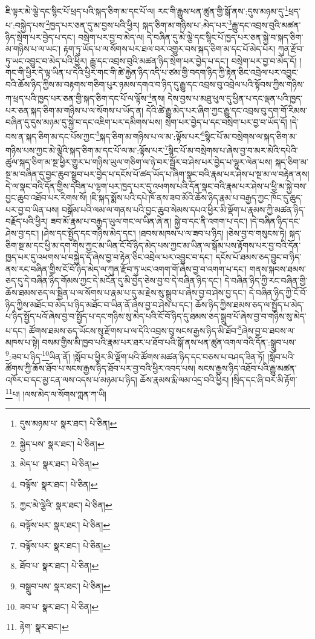 ཇི་ལྟར་མེ་ལྕེ་དང་སྙིང་པོ་ཕྲད་པའི་སྐད་ཅིག་མ་དང་པོ་ལ། རང་གི་རྒྱུས་ཕན་ཚུན་གྱི་སྒོ་ནས་:དུས་མཉམ་དུ་\footnote{དུས་མཉམ་པ་  སྣར་ཐང་།  པེ་ཅིན། }ཕྲད་པ་:བསྐྱེད་པས་\footnote{སྐྱེད་པས་  སྣར་ཐང་།  པེ་ཅིན། }ཁྱད་པར་ཅན་དུ་མ་བྱས་པའི་ཕྱིར། སྐད་ཅིག་མ་གཉིས་པ་:མེད་པར་\footnote{མེད་པ་  སྣར་ཐང་།  པེ་ཅིན། }རྒྱུ་དང་འབྲས་བུའི་མཚན་ཉིད་སྲེག་པར་བྱེད་པ་དང་། བསྲེག་པར་བྱ་བ་མེད་ལ། དེ་བཞིན་དུ་མེ་ལྕེ་དང་སྙིང་པོ་ཁྱད་པར་ཅན་སྐྱེ་བ་སྐད་ཅིག་མ་གཉིས་པ་ལ་ཡང་། རྟག་ཏུ་ཡོད་པ་ལ་སོགས་པར་ཐལ་བར་འགྱུར་བས་སྐད་ཅིག་མ་དང་པོ་མེད་པར། ཀུན་རྫོབ་ཏུ་ཡང་འབྱུང་བ་མེད་པའི་ཕྱིར། རྒྱུ་དང་འབྲས་བུའི་མཚན་ཉིད་སྲེག་པར་བྱེད་པ་དང་། བསྲེག་པར་བྱ་བ་མེད་དོ། །གང་གི་ཕྱིར་དེ་ལྟ་ཡིན་པ་དེའི་ཕྱིར་གང་གི་ཚེ་རྐྱེན་ཉིད་འདི་པ་ཙམ་གྱི་བདག་ཉིད་ཀྱི་རྟེན་ཅིང་འབྲེལ་པར་འབྱུང་བའི་ཆོས་ཉིད་ཀྱིས་མ་བརྟགས་གཅིག་པུར་ཉམས་དགའ་བ་ཉིད་དུ་རྒྱུ་དང་འབྲས་བུ་འབྲེལ་པའི་སྟོབས་ཀྱིས་གཉིས་ཀ་ཕྲད་པའི་ཁྱད་པར་ཅན་གྱི་སྐད་ཅིག་དང་པོ་ལ་ལྟོས་\footnote{བལྟོས་  སྣར་ཐང་།  པེ་ཅིན། }ནས། དེས་བྱས་པ་མཐུ་ཕུལ་དུ་ཕྱིན་པ་དང་ལྡན་པའི་ཁྱད་པར་ཅན་སྐད་ཅིག་མ་གཉིས་པ་ལ་སོགས་པ་ཡོད་ན། དེའི་ཚེ་རྒྱུ་མེད་པར་ཞིག་ཀྱང་རྒྱུ་དང་འབྲས་བུ་དག་གོ་རིམས་བཞིན་དུ་དུས་མཉམ་དུ་སྐྱེ་བ་དང་འཇིག་པར་དམིགས་པས། སྲེག་པར་བྱེད་པ་དང་བསྲེག་པར་བྱ་བ་ཡོད་དོ། །དེ་བས་ན་སྐད་ཅིག་མ་དང་པོས་ཀྱང་\footnote{ཀྱང་མེ་ལྕེའི་  སྣར་ཐང་།  པེ་ཅིན། }སྐད་ཅིག་མ་གཉིས་པ་ལ་མ་:ལྟོས་པར་\footnote{བལྟོས་པར་  སྣར་ཐང་།  པེ་ཅིན། }སྙིང་པོ་མ་བསྲེགས་ལ་སྐད་ཅིག་མ་གཉིས་པས་ཀྱང་མེ་ལྕེའི་སྐད་ཅིག་མ་དང་པོ་ལ་མ་:ལྟོས་པར་\footnote{བལྟོས་པར་  སྣར་ཐང་།  པེ་ཅིན། }སྙིང་པོ་མ་བསྲེགས་པ་ཞེས་བྱ་བ་མར་མེའི་དཔེའི་ཚུལ་སྐད་ཅིག་མ་སྔ་ཕྱིར་གྱུར་པ་གཉིས་ཡུལ་གཅིག་ལ་ཉེ་བར་སྦྱོར་བ་ཤེས་པར་བྱེད་པ་ལྷུར་ལེན་པས། སྐད་ཅིག་མ་སྔ་མ་བཞིན་དུ་བྱང་ཆུབ་སྒྲུབ་པར་བྱེད་པ་དངོས་པོ་ཚད་ཡོད་པ་ཞིག་སྣང་བའི་རྣམ་པར་ཤེས་པ་སྔ་མ་ལ་བརྟེན་ནས། དེ་ལ་སྣང་བའི་དོན་གྱིས་དབེན་པ་ལྷག་པར་ཁྱད་པར་དུ་འཕགས་པའི་དོན་སྣང་བའི་རྣམ་པར་ཤེས་པ་ཕྱི་མ་སྐྱེ་བས་བྱང་ཆུབ་འཐོབ་པར་རིགས་སོ། །ཇི་སྐད་སྨོས་པའི་དཔེ་ཁོ་ནས་ཟབ་མོའི་ཆོས་ཉིད་རྣམ་པ་བརྒྱད་ཀྱང་ཁོང་དུ་ཆུད་པར་བྱ་བ་ཡིན་པས། བསྒོམ་པའི་ལམ་ལ་གནས་པའི་བྱང་ཆུབ་སེམས་དཔའ་ཕྱིར་མི་ལྡོག་པ་རྣམས་ཀྱི་མཚན་ཉིད་བརྗོད་པའི་ཕྱིར། ཟབ་མོ་རྣམ་པ་བརྒྱད་ཡུལ་གང་ལ་ཡིན་ཞེ་ན། སྐྱེ་བ་དང་ནི་འགག་པ་དང་། །དེ་བཞིན་ཉིད་དང་ཤེས་བྱ་དང་། །ཤེས་དང་སྤྱོད་དང་གཉིས་མེད་དང་། །ཐབས་མཁས་པ་ལ་ཟབ་པ་ཉིད། །ཅེས་བྱ་བ་གསུངས་ཏེ། སྐད་ཅིག་སྔ་མ་དང་ཕྱི་མ་དག་གིས་ཀྱང་མ་ཡིན་ངོ་བོ་ཉིད་མེད་པས་ཀྱང་མ་ཡིན་ལ་སྒོམ་པས་རྟོགས་པར་བྱ་བའི་དོན་ཁྱད་པར་དུ་འཕགས་པ་བསྐྱེད་དོ་ཞེས་བྱ་བ་རྟེན་ཅིང་འབྲེལ་པར་འབྱུང་བ་དང་། དངོས་པོ་ཐམས་ཅད་བྱུང་བ་ཉིད་ནས་རང་བཞིན་གྱིས་ངོ་བོ་ཉིད་མེད་ལ་ཀུན་རྫོབ་ཏུ་ཡང་འགག་གོ་ཞེས་བྱ་བ་འགག་པ་དང་། གནས་སྐབས་ཐམས་ཅད་དུ་དེ་བཞིན་ཉིད་གོམས་ཀྱང་དེ་མངོན་དུ་མི་བྱེད་ཅེས་བྱ་བ་དེ་བཞིན་ཉིད་དང་། དེ་བཞིན་ཉིད་ཀྱི་རང་བཞིན་གྱི་ཆོས་ཐམས་ཅད་ལ་སྦྱིན་པ་ལ་སོགས་པ་རྣམ་པ་དུ་མ་རྗེས་སུ་སྒྲུབ་པ་ཞེས་བྱ་བ་ཤེས་བྱ་དང་། དེ་བཞིན་ཉིད་ཀྱི་ངོ་བོ་ཉིད་ཀྱིས་མཐོང་བ་མེད་པ་ཉིད་མཐོང་བ་ཡིན་ནོ་ཞེས་བྱ་བ་ཤེས་པ་དང་། ཆོས་ཉིད་ཀྱིས་ཐམས་ཅད་ལ་སྤྱོད་པ་མེད་པ་ཉིད་སྤྱོད་པའོ་ཞེས་བྱ་བ་སྤྱོད་པ་དང་གཉིས་སུ་མེད་པའི་ངོ་བོ་ཉིད་དུ་ཐམས་ཅད་སྒྲུབ་པོ་ཞེས་བྱ་བ་གཉིས་སུ་མེད་པ་དང་། ཚོགས་ཐམས་ཅད་ཡོངས་སུ་རྫོགས་པ་ལ་དེའི་འབྲས་བུ་སངས་རྒྱས་ཉིད་མི་ཐོབ་\footnote{ཐོབ་པ་  སྣར་ཐང་།  པེ་ཅིན། }ཞེས་བྱ་བ་ཐབས་ལ་མཁས་པ་སྟེ། བསམ་གྱིས་མི་ཁྱབ་པའི་རྣམ་པར་ཐར་པ་ཐོབ་པའི་སྒོ་ནས་ཕན་ཚུན་འགལ་བའི་དོན་:སྒྲུབ་པས་\footnote{བསྒྲུབ་པས་  སྣར་ཐང་།  པེ་ཅིན། }:ཟབ་པ་ཉིད་\footnote{ཟབ་པ་  སྣར་ཐང་།  པེ་ཅིན། }ཡིན་ནོ། །སློབ་པ་ཕྱིར་མི་ལྡོག་པའི་ཚོགས་མཚན་ཉིད་དང་བཅས་པ་བཤད་ཟིན་ཏོ། །སློབ་པའི་ཚོགས་ཀྱི་ཆོས་ཐོབ་པ་སངས་རྒྱས་ཉིད་ཐོབ་པར་བྱ་བའི་ཕྱིར་འབད་པས། སངས་རྒྱས་ཉིད་འཐོབ་པའི་རྒྱུ་མཚན་འཁོར་བ་དང་མྱ་ངན་ལས་འདས་པ་མཉམ་པ་ཉིད། ཆོས་རྣམས་རྨི་ལམ་འདྲ་བའི་ཕྱིར། །སྲིད་དང་ཞི་བར་མི་རྟོག་\footnote{རྟེག་  སྣར་ཐང་། }པ། །ལས་མེད་ལ་སོགས་ཀླན་ཀ་ཡི། 